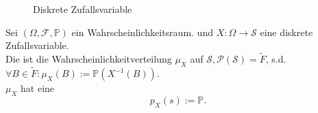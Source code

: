 \begin{figure}[ht]
    \centering
    \caption{Diskrete Zufallsvariable}
    \label{fig:diskrete-zufallsvariable}
\end{figure}
\begin{definition}
    Sei $(\Omega, \mathcal{F}, \mathbb{P})$ ein Wahrscheinlichkeitsraum.  und $X : \Omega\to \mathcal{S}$ eine diskrete Zufallsvariable. \\
    Die  ist die Wahrscheinlichkeitverteilung $\mu_X$ auf  $\mathcal{S}, \mathcal{P}(\mathcal{S}) = \tilde{F}$, s.d. $\forall B\in \tilde{F}: \mu_X(B) := \mathbb{P}(X^{-1}(B))$. \\
    $\mu_X$ hat eine 
     \[
         p_{X}(s) := \mathbb{P}
    .\] 
\end{definition}
